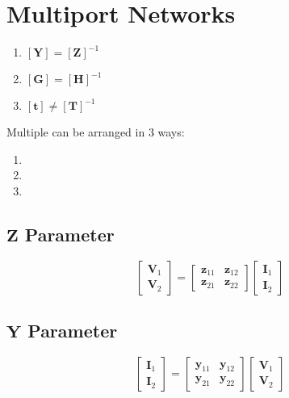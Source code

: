 \section*{Multiport Networks} \label{sec:Multiport Networks}
	\begin{enumerate}
		\item $\left[ \mathbf{Y} \right] = \left[ \mathbf{Z} \right]^{-1}$
		\item $\left[ \mathbf{G} \right] = \left[ \mathbf{H} \right]^{-1}$
		\item $\left[ \mathbf{t} \right] \neq \left[ \mathbf{T} \right]^{-1}$
	\end{enumerate}

Multiple  can be arranged in 3 ways:
	\begin{enumerate}
		\item {}
		\item {}
		\item {}
	\end{enumerate}

	\subsection*{$\mathbf{Z}$ Parameter} \label{subsec:Z Parameter}
		\begin{equation*} \label{eq:Z Parameter}
			\begin{bmatrix}
				\mathbf{V}_{1} \\
				\mathbf{V}_{2}
			\end{bmatrix}
			=\begin{bmatrix}
				\mathbf{z}_{11} & \mathbf{z}_{12} \\
				\mathbf{z}_{21} & \mathbf{z}_{22}
			\end{bmatrix}
			\begin{bmatrix}
				\mathbf{I}_{1} \\
				\mathbf{I}_{2}
			\end{bmatrix}
		\end{equation*}
		
	\subsection*{$\mathbf{Y}$ Parameter} \label{subsec:Y Parameter}
		\begin{equation*} \label{eq:Y Parameter}
			\begin{bmatrix}
				\mathbf{I}_{1} \\
				\mathbf{I}_{2} 
			\end{bmatrix}
			=\begin{bmatrix}
				\mathbf{y}_{11} & \mathbf{y}_{12} \\
				\mathbf{y}_{21} & \mathbf{y}_{22}
			\end{bmatrix}
			\begin{bmatrix}
				\mathbf{V}_{1} \\
				\mathbf{V}_{2} 
			\end{bmatrix}
		\end{equation*}
		
